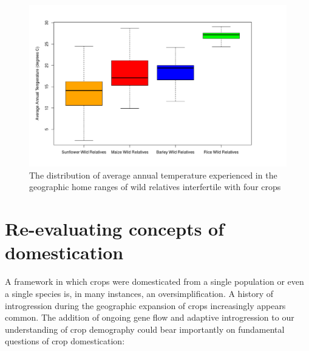 \documentclass[11pt]{article}
\begin{document}
\begin{figure}[h]
	\centering
	\includegraphics[width=17.35cm]{boxplot.png}
	\caption{The distribution of average annual temperature experienced in the geographic home ranges of wild relatives interfertile with four crops}
	\label{fig:map}
\end{figure}

























\section*{Re-evaluating concepts of domestication}

A framework in which crops were domesticated from a single population or even a single species is, in many instances, an oversimplification.
A history of introgression during the geographic expansion of crops increasingly appears common.
The addition of ongoing gene flow and adaptive introgression to our understanding of crop demography could bear importantly on fundamental questions of crop domestication:
\end{document}
